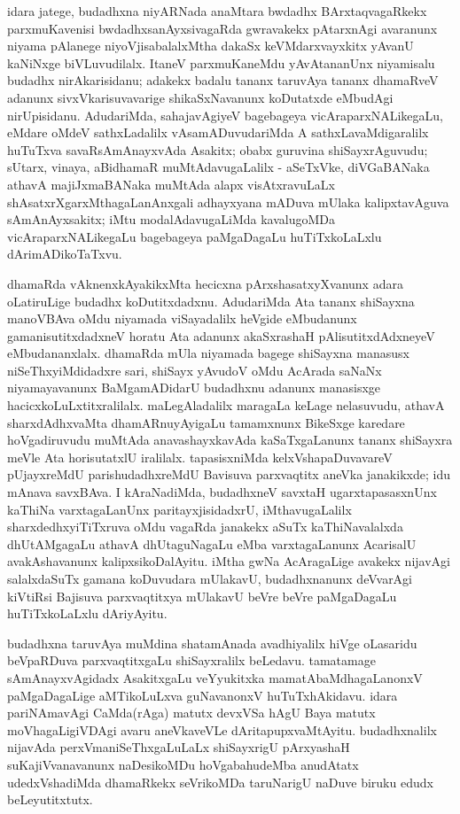 idara jatege, budadhxna niyARNada anaMtara bwdadhx BArxtaqvagaRkekx parxmuKa\-venisi bwdadhxsanAyxsivagaRda gwravakekx pAtarxnAgi avaranunx niyama pAlanege niyoVjisa\-balalxMtha dakaSx keVMdarxvayxkitx yAvanU kaNiNxge biVLuvudilalx. ItaneV parxmuKaneMdu yAvAta\-nanUnx niyamisalu budadhx nirAkarisidanu; adakekx badalu tananx taruvAya tananx dhamaRveV adanunx sivxVkarisuvavarige shikaSxNavanunx koDutatxde eMbudAgi nirUpi\-sidanu. AdudariMda, sahajavAgiyeV bagebageya vicAraparxNALikegaLu, eMdare oMdeV sathxLadalilx vAsamADuvudariMda A sathxLavaMdigaralilx huTuTxva savaRsAmAnayxvAda Asakitx; obabx guruvina shiSayxrAguvudu; sUtarx, vinaya, aBidhamaR muMtA\-davugaLalilx - aSeTxVke, diVGaBANaka athavA majiJxmaBANaka muMtAda alapx visAtxra\-vuLaLx shAsatxrXgarxMthagaLanAnxgali adhayxyana mADuva mUlaka kalipxtavAguva sAmAnAyxsakitx; iMtu modalAdavugaLiMda kavalugoMDa vicAraparxNALikegaLu bagebageya paMgaDagaLu huTiTxkoLaLxlu dArimADikoTaTxvu.

dhamaRda vAknenxkAyakikxMta hecicxna pArxshasatxyXvanunx adara oLatiruLige budadhx koDutitxdadxnu. AdudariMda Ata tananx shiSayxna manoVBAva oMdu niyamada viSayadalilx heVgide eMbudanunx gamanisutitxdadxneV horatu Ata adanunx akaSxrashaH pAlisutitxdAdxneyeV eMbudananxlalx. dhamaRda mUla niyamada bagege shiSayxna manasusx niSeThxyiMdidadxre sari, shiSayx yAvudoV oMdu AcArada saNaNx niyamayavanunx BaMgamADidarU budadhxnu adanunx manasisxge hacicxkoLuLxtitxralilalx. maLegAladalilx maragaLa keLage nelasuvudu, athavA sharxdAdhxvaMta dhamARnuyAyigaLu tamamxnunx BikeSxge karedare hoVgadiruvudu muMtAda anavashayxkavAda kaSaTxgaLanunx tananx shiSayxra meVle Ata horisutatxlU iralilalx. tapasisxniMda kelxVshapaDuvavareV pUjayxreMdU parishudadhxreMdU Bavisuva parxvaqtitx aneVka janakikxde; idu mAnava savxBAva. I kAraNadiMda, budadhxneV savxtaH ugarxtapasasxnUnx kaThiNa varxtagaLanUnx paritayxjisidadxrU, iMthavugaLalilx sharxdedhxyiTiTxruva oMdu vagaRda janakekx aSuTx kaThiNavalalxda dhUtAMgagaLu athavA dhUtaguNagaLu eMba varxtagaLanunx AcarisalU avakAshavanunx kalipxsikoDalAyitu. iMtha gwNa AcAragaLige avakekx nijavAgi salalxdaSuTx gamana koDuvudara mUlakavU, budadhxnanunx deVvarAgi kiVtiRsi Bajisuva parxvaqtitxya mUlakavU beVre beVre paMgaDagaLu huTiTxkoLaLxlu dAriyAyitu.

budadhxna taruvAya muMdina shatamAnada avadhiyalilx hiVge oLasaridu beVpaR\-Duva parxvaqtitxgaLu shiSayxralilx beLedavu. tamatamage sAmAnayxvAgidadx AsakitxgaLu veYyu\-kitxka mamatAbaMdhagaLanonxV paMgaDagaLige aMTikoLuLxva guNavanonxV huTuTxhAkidavu. idara pariNAmavAgi CaMda(rAga) matutx devxVSa hAgU Baya matutx moVhagaLi\-giVDAgi avaru aneVkaveVLe dAritapupxvaMtAyitu. budadhxnalilx nijavAda perxVmaniSeThxgaLuLaLx shiSayx\-rigU pArxyashaH suKajiVvanavanunx naDesikoMDu hoVgabahudeMba anudAtatx udedxVsha\-diMda dhamaRkekx seVrikoMDa taruNarigU naDuve biruku edudx beLeyutitxtutx.

